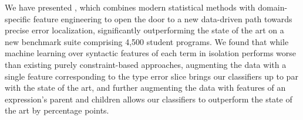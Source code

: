 \label{sec:nate:conclusion}

We have presented \toolname, which
combines modern statistical methods
with domain-specific feature engineering
to open the door to a new data-driven
path towards precise error localization,
significantly outperforming the
state of the art on a new benchmark
suite comprising 4,500 student programs.
%
%
We found that while machine learning
over syntactic features of each term in isolation
performs worse than existing
purely constraint-based approaches, %
augmenting the data with a single feature corresponding to
the type error slice brings our
classifiers up to par with the state of the art,
and further augmenting the data with
features of an expression's parent and children
allows our classifiers to outperform
the state of the art by \ToolnameWinSherrloc
percentage points.



